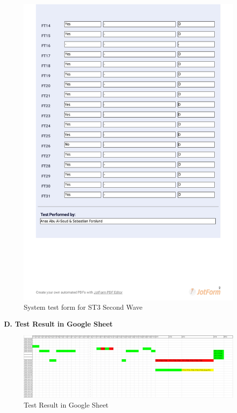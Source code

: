 \documentclass{article}
\begin{document}
 \begin{figure}
     \centering
      \includegraphics[trim={0cm 15cm 0cm 0cm}, clip,width=13cm]
      {images/2021-03-08_Anas_ST3-2}
     \renewcommand\figurename{Figure}
     \caption{System test form for ST3 Second Wave}
     \label{fig:my_label}
 \end{figure}

\newpage
\begin{flushleft}
{\large \textbf{D. Test Result in Google Sheet}}
\end{flushleft}



 \begin{figure}
     \centering
     \includegraphics[scale = 0.5, angle = 270]{images/puspSheet}
     \renewcommand\figurename{Figure}
     \caption{Test Result in Google Sheet}
     \label{fig:my_label}
 \end{figure}
\end{document}
